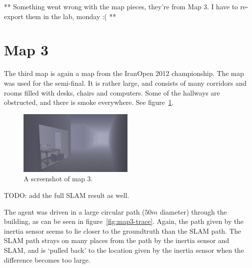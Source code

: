 ** Something went wrong with the map pieces, they're from Map 3. I have to re-export them in the lab, monday :( **





\section{Map 3}
The third map is again a map from the IranOpen 2012 championship. The map was used for the semi-final. It is rather large, and consists of many corridors and rooms filled with desks, chairs and computers. Some of the hallways are obstructed, and there is smoke everywhere. See figure~\ref{fig:map3-screenshot}.

\begin{figure}[ht]
\centering
  \includegraphics[width=0.5\textwidth]{images/experiment/map3/map3.png}
  \caption{A screenshot of map 3.}
  \label{fig:map3-screenshot}
\end{figure}

TODO: add the full SLAM result as well.

The agent was driven in a large circular path ($50m$ diameter) through the building, as can be seen in figure~\ref{fig:map3-trace}. Again, the path given by the inertia sensor seems to lie closer to the groundtruth than the SLAM path. The SLAM path strays on many places from the path by the inertia sensor and SLAM, and is `pulled back' to the location given by the inertia sensor when the difference becomes too large.

